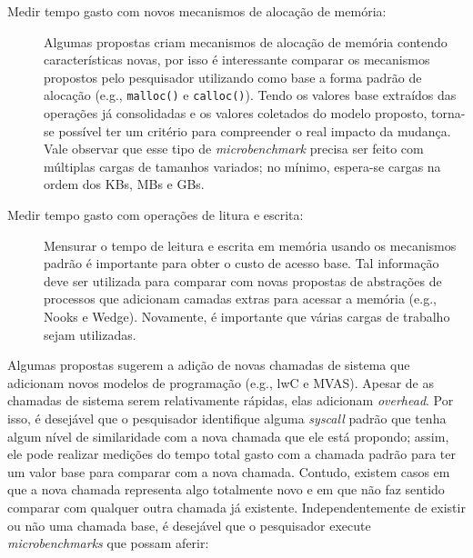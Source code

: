 \begin{description}

  \item[Medir tempo gasto com novos mecanismos de alocação de memória:]

Algumas propostas criam mecanismos de alocação de memória contendo
características novas, por isso é interessante comparar os mecanismos
propostos pelo pesquisador utilizando como base a forma padrão de alocação
(e.g., \texttt{malloc()} e \texttt{calloc()}). Tendo os valores base extraídos
das operações já consolidadas e os valores coletados do modelo proposto,
torna-se possível ter um critério para compreender o real impacto da mudança.
Vale observar que esse tipo de \textit{microbenchmark} precisa ser feito com
múltiplas cargas de tamanhos variados; no mínimo, espera-se cargas na ordem dos
KBs, MBs e GBs.

  \item[Medir tempo gasto com operações de litura e escrita:]

Mensurar o tempo de leitura e escrita em memória usando os mecanismos
padrão é importante para obter o custo de acesso base. Tal informação deve ser
utilizada para comparar com novas propostas de abstrações de processos que
adicionam camadas extras para acessar a memória (e.g., Nooks e Wedge).
Novamente, é importante que várias cargas de trabalho sejam utilizadas.

\end{description}

Algumas propostas sugerem a adição de novas chamadas de sistema que adicionam
novos modelos de programação (e.g., lwC e MVAS). Apesar de as chamadas de sistema
serem relativamente rápidas, elas adicionam \textit{overhead}. Por isso, é
desejável que o pesquisador identifique alguma \textit{syscall} padrão que tenha
algum nível de similaridade com a nova chamada que ele está propondo; assim, ele
pode realizar medições do tempo total gasto com a chamada padrão para ter um valor
base para comparar com a nova chamada. Contudo, existem casos em que a nova
chamada representa algo totalmente novo e em que não faz sentido comparar com
qualquer outra chamada já existente. Independentemente de existir ou não uma
chamada base, é desejável que o pesquisador execute \textit{microbenchmarks} que
possam aferir:

